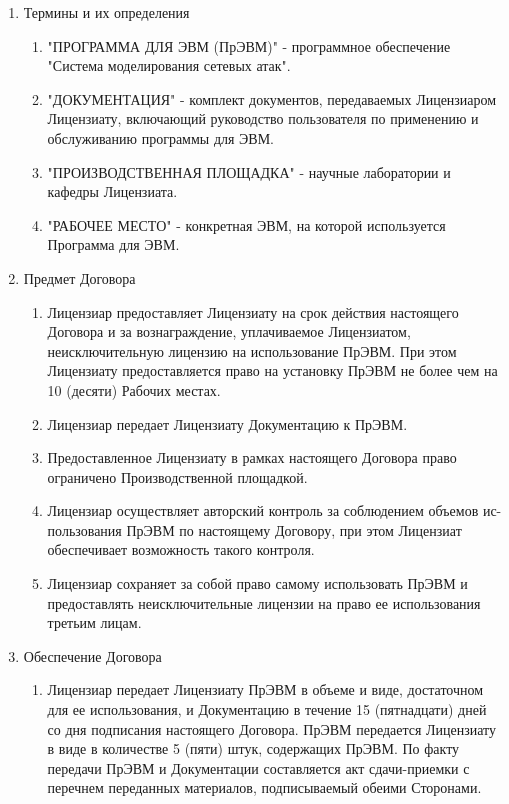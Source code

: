 \begin{enumerate}
    \item Термины и их определения
    \begin{enumerate}
        \item "ПРОГРАММА ДЛЯ ЭВМ (ПрЭВМ)" - программное обеспечение "Система моделирования сетевых атак".
        \item "ДОКУМЕНТАЦИЯ" - комплект документов, передаваемых Лицензиаром Лицензиату, включающий руководство пользователя по применению и обслуживанию программы для ЭВМ.
        \item "ПРОИЗВОДСТВЕННАЯ ПЛОЩАДКА" - научные лаборатории и кафедры Лицензиата.
        \item "РАБОЧЕЕ МЕСТО" - конкретная ЭВМ, на которой используется Программа для ЭВМ.
    \end{enumerate}
    \item Предмет Договора
        \begin{enumerate}
            \item Лицензиар предоставляет Лицензиату на срок действия настоящего Договора и за вознаграждение, уплачиваемое Лицензиатом, неисключительную лицензию на использование ПрЭВМ. При этом Лицензиату предоставляется право на установку ПрЭВМ не более чем на 10 (десяти) Рабочих местах.
            \item Лицензиар передает Лицензиату Документацию к ПрЭВМ.
            \item Предоставленное Лицензиату в рамках настоящего Договора право ограничено Производственной площадкой.
            \item Лицензиар осуществляет авторский контроль за соблюдением объемов ис-пользования ПрЭВМ по настоящему Договору, при этом Лицензиат обеспечивает возможность такого контроля.
            \item Лицензиар сохраняет за собой право самому использовать ПрЭВМ и предоставлять неисключительные лицензии на право ее использования третьим лицам.
        \end{enumerate}
    \item Обеспечение Договора
    \begin{enumerate}
        \item Лицензиар передает Лицензиату ПрЭВМ в объеме и виде, достаточном для ее использования, и Документацию в течение 15 (пятнадцати) дней со дня подписания настоящего Договора. ПрЭВМ передается Лицензиату в виде   в количестве 5 (пяти) штук, содержащих ПрЭВМ. По факту передачи ПрЭВМ и Документации составляется акт сдачи-приемки с перечнем переданных материалов, подписываемый обеими Сторонами.

\end{enumerate}
\end{enumerate}
